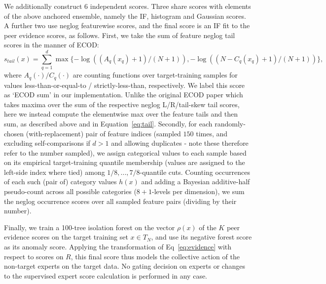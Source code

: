 We additionally construct 6 independent scores. Three share scores with elements of the above anchored ensemble, namely the IF, histogram and Gaussian scores. A further two use neglog featurewise scores, and the final score is an IF fit to the peer evidence scores, as follows. First, we take the sum of feature neglog tail scores in the manner of ECOD:
\begin{equation} 
s_{tail}(x) = \sum_{q=1}^d \max\{-\log((A_q(x_q)+1)/(N+1)), -\log((N-C_q(x_q)+1)/(N+1))\}, 
\label{eq:tail} 
\end{equation} 
where $A_q(\cdot)/C_q(\cdot)$ are counting functions over target-training samples for values less-than-or-equal-to / strictly-less-than, respectively. We label this score as `ECOD sum' in our implementation. Unlike the original ECOD paper \cite{ecod2022} which takes maxima over the sum of the respective neglog L/R/tail-skew tail scores, here we instead compute the elementwise max over the feature tails and then sum, as described above and in Equation~\ref{eq:tail}. Secondly, for each randomly-chosen (with-replacement) pair of feature indices (sampled $150$ times, and excluding self-comparisons if $d > 1$ and allowing duplicates - note these therefore refer to the number sampled), we assign categorical values to each sample based on its empirical target-training quantile membership (values are assigned to the left-side index where tied) among $1/8, ..., 7/8$-quantile cuts. Counting occurrences of each such (pair of) category values $h(x)$ and adding a Bayesian additive-half pseudo-count across all possible categories ($8+1$-levels per dimension), we sum the neglog occurrence scores over all sampled feature pairs (dividing by their number).

Finally, we train a 100-tree isolation forest on the vector $\rho(x)$ of the $K$ peer evidence scores on the target training set $x\in T_N$, and use its negative forest score as its anomaly score. Applying the transformation of Eq~\ref{eq:evidence} with respect to scores on $R$, this final score thus models the collective action of the non-target experts on the target data. No gating decision on experts or changes to the supervised expert score calculation is performed in any case.



